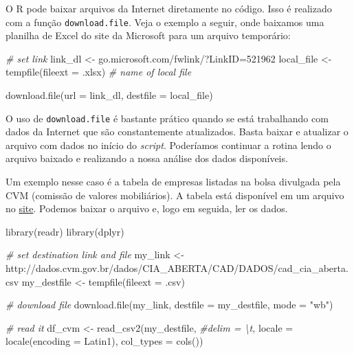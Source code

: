 \documentclass[
  11pt,
]{book}
\newenvironment{Shaded}{\begin{snugshade}}{\end{snugshade}}
\newcommand{\AttributeTok}[1]{\textcolor[rgb]{0.61,0.61,0.61}{#1}}
\newcommand{\CommentTok}[1]{\textcolor[rgb]{0.37,0.37,0.37}{\textit{#1}}}
\newcommand{\FunctionTok}[1]{\textcolor[rgb]{0,0,0}{#1}}
\newcommand{\NormalTok}[1]{#1}
\newcommand{\OtherTok}[1]{\textcolor[rgb]{0.37,0.37,0.37}{#1}}
\newcommand{\StringTok}[1]{\textcolor[rgb]{0.5,0.5,0.5}{#1}}
\begin{document}
O R pode baixar arquivos da Internet diretamente no código. Isso é realizado com a função \texttt{download.file}. Veja o exemplo a seguir, onde baixamos uma planilha de Excel do site da Microsoft para um arquivo temporário:

\begin{Shaded}
\begin{Highlighting}[]
\CommentTok{\# set link}
\NormalTok{link\_dl }\OtherTok{\textless{}{-}} \StringTok{\textquotesingle{}go.microsoft.com/fwlink/?LinkID=521962\textquotesingle{}}
\NormalTok{local\_file }\OtherTok{\textless{}{-}} \FunctionTok{tempfile}\NormalTok{(}\AttributeTok{fileext =} \StringTok{\textquotesingle{}.xlsx\textquotesingle{}}\NormalTok{) }\CommentTok{\# name of local file}

\FunctionTok{download.file}\NormalTok{(}\AttributeTok{url =}\NormalTok{ link\_dl,}
              \AttributeTok{destfile =}\NormalTok{ local\_file)}
\end{Highlighting}
\end{Shaded}

O uso de \texttt{download.file} é bastante prático quando se está trabalhando com dados da Internet que são constantemente atualizados. Basta baixar e atualizar o arquivo com dados no início do \emph{script}. Poderíamos continuar a rotina lendo o arquivo baixado e realizando a nossa análise dos dados disponíveis.

Um exemplo nesse caso é a tabela de empresas listadas na bolsa divulgada pela CVM (comissão de valores mobiliários). A tabela está disponível em um arquivo no \href{http://dados.cvm.gov.br/dados/CIA_ABERTA/CAD/DADOS/cad_cia_aberta.csv}{site}. Podemos baixar o arquivo e, logo em seguida, ler os dados.

\begin{Shaded}
\begin{Highlighting}[]
\FunctionTok{library}\NormalTok{(readr)}
\FunctionTok{library}\NormalTok{(dplyr)}

\CommentTok{\# set destination link and file}
\NormalTok{my\_link }\OtherTok{\textless{}{-}} \StringTok{\textquotesingle{}http://dados.cvm.gov.br/dados/CIA\_ABERTA/CAD/DADOS/cad\_cia\_aberta.csv\textquotesingle{}}
\NormalTok{my\_destfile }\OtherTok{\textless{}{-}} \FunctionTok{tempfile}\NormalTok{(}\AttributeTok{fileext =} \StringTok{\textquotesingle{}.csv\textquotesingle{}}\NormalTok{)}

\CommentTok{\# download file}
\FunctionTok{download.file}\NormalTok{(my\_link, }
              \AttributeTok{destfile =}\NormalTok{ my\_destfile, }
              \AttributeTok{mode =} \StringTok{"wb"}\NormalTok{)}

\CommentTok{\# read it}
\NormalTok{df\_cvm }\OtherTok{\textless{}{-}} \FunctionTok{read\_csv2}\NormalTok{(my\_destfile,}
                     \CommentTok{\#delim = \textquotesingle{}\textbackslash{}t\textquotesingle{},}
                     \AttributeTok{locale =} \FunctionTok{locale}\NormalTok{(}\AttributeTok{encoding =} \StringTok{\textquotesingle{}Latin1\textquotesingle{}}\NormalTok{),}
                     \AttributeTok{col\_types =} \FunctionTok{cols}\NormalTok{())}
\end{Highlighting}
\end{Shaded}
\end{document}
